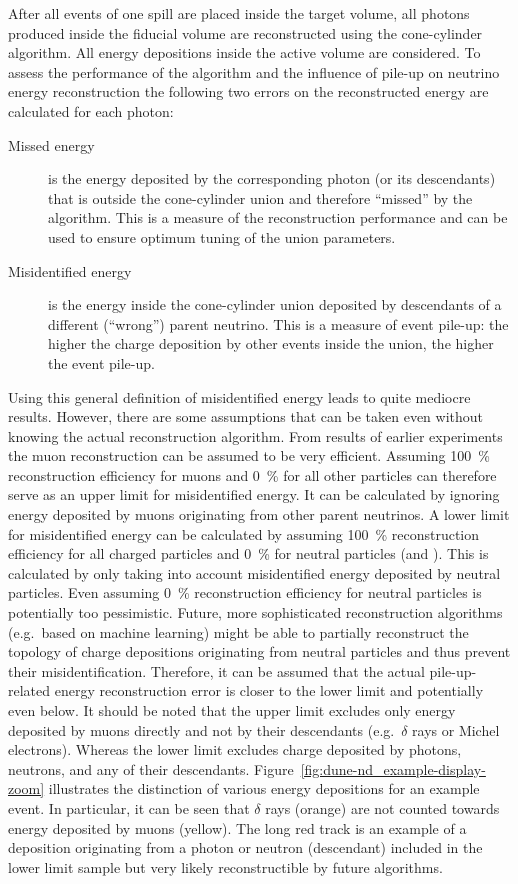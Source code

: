 After all events of one spill are placed inside the target volume, all \Pgpz photons produced inside the fiducial volume are reconstructed using the cone-cylinder algorithm.
All energy depositions inside the active volume are considered.
To assess the performance of the algorithm and the influence of pile-up on neutrino energy reconstruction the following two errors on the reconstructed energy are calculated for each \Pgpz photon:
\begin{description}
	\item[Missed energy] is the energy deposited by the corresponding \Pgpz photon (or its descendants) that is outside the cone-cylinder union and therefore ``missed'' by the algorithm.
		This is a measure of the reconstruction performance and can be used to ensure optimum tuning of the union parameters.
	\item[Misidentified energy] is the energy inside the cone-cylinder union deposited by descendants of a different (``wrong'') parent neutrino.
		This is a measure of event pile-up: the higher the charge deposition by other events inside the union, the higher the event pile-up.
\end{description}
Using this general definition of misidentified energy leads to quite mediocre results.
However, there are some assumptions that can be taken even without knowing the actual reconstruction algorithm.
From results of earlier experiments~\cite{pandora} the muon reconstruction can be assumed to be very efficient.
Assuming \SI{100}{\percent} reconstruction efficiency for muons and \SI{0}{\percent} for all other particles can therefore serve as an upper limit for misidentified energy.
It can be calculated by ignoring energy deposited by muons originating from other parent neutrinos.
A lower limit for misidentified energy can be calculated by assuming \SI{100}{\percent} reconstruction efficiency for all charged particles and \SI{0}{\percent} for neutral particles (\Pgg and \Pn).
This is calculated by only taking into account misidentified energy deposited by neutral particles.
Even assuming \SI{0}{\percent} reconstruction efficiency for neutral particles is potentially too pessimistic.
Future, more sophisticated reconstruction algorithms (e.g.\ based on machine learning) might be able to partially reconstruct the topology of charge depositions originating from neutral particles and thus prevent their misidentification.
Therefore, it can be assumed that the actual pile-up-related energy reconstruction error is closer to the lower limit and potentially even below.
It should be noted that the upper limit excludes only energy deposited by muons directly and not by their descendants (e.g.\ $\delta$ rays or Michel electrons).
Whereas the lower limit excludes charge deposited by photons, neutrons, and any of their descendants.
Figure~\ref{fig:dune-nd_example-display-zoom} illustrates the distinction of various energy depositions for an example event.
In particular, it can be seen that $\delta$ rays (orange) are not counted towards energy deposited by muons (yellow).
The long red track is an example of a deposition originating from a photon or neutron (descendant) included in the lower limit sample but very likely reconstructible by future algorithms.

